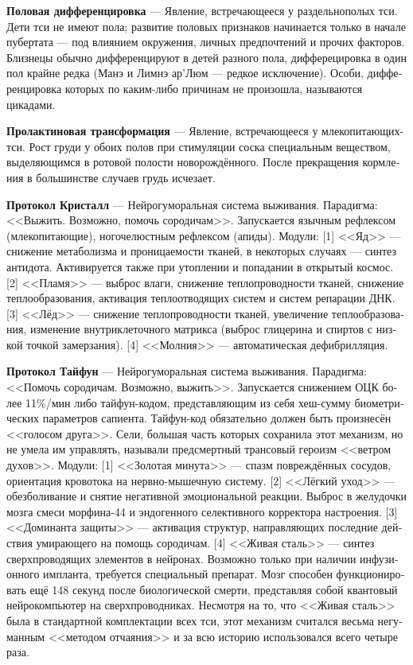 \documentclass[a4paper,12pt,fleqn]{book}\usepackage{polyglossia}\setdefaultlanguage[babelshorthands=true]{russian}\setotherlanguage{english}\defaultfontfeatures{Ligatures=TeX,Mapping=tex-text}\usepackage{xcolor}\newcommand{\ml}[3]{#2}
\newcommand{\theterm}[3]{\textbf{\hypertarget{#1}{#2}} --- #3}
\begin{document}
\theterm{differentiation}
{Половая дифференцировка}
{Явление, встречающееся у раздельнополых тси.
Дети тси не имеют пола;
развитие половых признаков начинается только в начале пубертата --- под влиянием окружения, личных предпочтений и прочих факторов.
Близнецы обычно дифференцируют в детей разного пола, дифферецировка в один пол крайне редка (Манэ и Лимнэ ар'Люм --- редкое исключение).
Особи, дифференцировка которых по каким-либо причинам не произошла, называются цикадами.}

\theterm{prolactin-transformation}
{Пролактиновая трансформация}
{Явление, встречающееся у млекопитающих-тси.
Рост груди у обоих полов при стимуляции соска специальным веществом, выделяющимся в ротовой полости новорождённого.
После прекращения кормления в большинстве случаев грудь исчезает.}

\theterm{protocol-crystall}
{Протокол Кристалл}
{Нейрогуморальная система выживания.
Парадигма: <<Выжить.
Возможно, помочь сородичам>>.
Запускается язычным рефлексом (млекопитающие), ногочелюстным рефлексом (апиды).
Модули:
[1] <<Яд>> --- снижение метаболизма и проницаемости тканей, в некоторых случаях --- синтез антидота.
Активируется также при утоплении и попадании в открытый космос.
[2] <<Пламя>> --- выброс влаги, снижение теплопроводности тканей, снижение теплообразования, активация теплоотводящих систем и систем репарации ДНК.
[3] <<Лёд>> --- снижение теплопроводности тканей, увеличение теплообразования, изменение внутриклеточного матрикса (выброс глицерина и спиртов с низкой точкой замерзания).
[4] <<Молния>> --- автоматическая дефибрилляция.}

\theterm{protocol-taifeng}
{Протокол Тайфун}
{Нейрогуморальная система выживания.
Парадигма: <<Помочь сородичам.
Возможно, выжить>>.
Запускается снижением ОЦК более 11\%/мин либо тайфун-кодом, представляющим из себя хеш-сумму биометрических параметров сапиента.
Тайфун-код обязательно должен быть произнесён <<голосом друга>>.
Сели, большая часть которых сохранила этот механизм, но не умела им управлять, называли предсмертный трансовый героизм <<ветром духов>>.
Модули:
[1] <<Золотая минута>> --- спазм повреждённых сосудов, ориентация кровотока на нервно-мышечную систему.
[2] <<Лёгкий уход>> --- обезболивание и снятие негативной эмоциональной реакции.
Выброс в желудочки мозга смеси морфина-44 и эндогенного селективного корректора настроения.
[3] <<Доминанта защиты>> --- активация структур, направляющих последние действия умирающего на помощь сородичам.
[4] <<Живая сталь>> --- синтез сверхпроводящих элементов в нейронах.
Возможно только при наличии инфузионного импланта, требуется специальный препарат.
Мозг способен функционировать ещё 148 секунд после биологической смерти, представляя собой квантовый нейрокомпьютер на сверхпроводниках.
Несмотря на то, что <<Живая сталь>> была в стандартной комплектации всех тси, этот механизм считался весьма негуманным <<методом отчаяния>> и за всю историю использовался всего четыре раза.}
\end{document}
